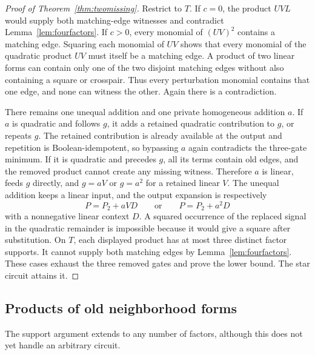 \documentclass[11pt]{article}
\theoremstyle{definition}
\theoremstyle{remark}
\begin{document}
\begin{proof}[Proof of Theorem~\ref{thm:twomissing}]
Restrict to $T$. If $c=0$, the product $UVL$ would supply both matching-edge witnesses and contradict Lemma~\ref{lem:fourfactors}. If $c>0$, every monomial of $(UV)^2$ contains a matching edge. Squaring each monomial of $UV$ shows that every monomial of the quadratic product $UV$ must itself be a matching edge. A product of two linear forms can contain only one of the two disjoint matching edges without also containing a square or crosspair. Thus every perturbation monomial contains that one edge, and none can witness the other. Again there is a contradiction.

There remains one unequal addition and one private homogeneous addition $a$. If $a$ is quadratic and follows $g$, it adds a retained quadratic contribution to $g$, or repeats $g$. The retained contribution is already available at the output and repetition is Boolean-idempotent, so bypassing $a$ again contradicts the three-gate minimum. If it is quadratic and precedes $g$, all its terms contain old edges, and the removed product cannot create any missing witness. Therefore $a$ is linear, feeds $g$ directly, and $g=aV$ or $g=a^2$ for a retained linear $V$. The unequal addition keeps a linear input, and the output expansion is respectively
\[
 P=P_2+aVD\qquad\text{or}\qquad P=P_2+a^2D
\]
with a nonnegative linear context $D$. A squared occurrence of the replaced signal in the quadratic remainder is impossible because it would give a square after substitution. On $T$, each displayed product has at most three distinct factor supports. It cannot supply both matching edges by Lemma~\ref{lem:fourfactors}. These cases exhaust the three removed gates and prove the lower bound. The star circuit attains it.
\end{proof}

\subsection{Products of old neighborhood forms}
The support argument extends to any number of factors, although this does not yet handle an arbitrary circuit.
\end{document}
